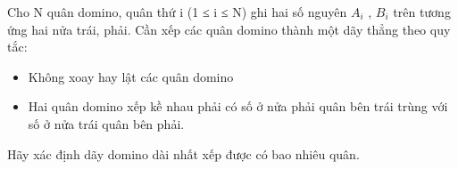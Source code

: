 Cho N quân domino, quân thứ i (1 ≤ i ≤ N) ghi hai số nguyên $A_{­i}$ , $B_{i}$ trên tương ứng hai nửa trái, phải. Cần xếp các quân domino thành một dãy thẳng theo quy tắc:
\begin{itemize}
	\item Không xoay hay lật các quân domino
	\item Hai quân domino xếp kề nhau phải có số ở nửa phải quân bên trái trùng với số ở nửa trái quân bên phải.
\end{itemize}

Hãy xác định dãy domino dài nhất xếp được có bao nhiêu quân.